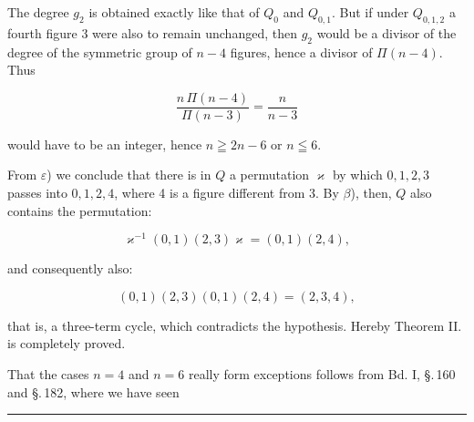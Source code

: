 The degree $g_2$ is obtained exactly like that of $Q_0$ and $Q_{0,1}$. But if
under $Q_{0,1,2}$ a fourth figure 3 were also to remain unchanged, then $g_2$
would be a divisor of the degree of the symmetric group of $n-4$ figures, hence
a divisor of $\Pi(n-4)$. Thus

\[ \frac{n\,\Pi(n-4)}{\Pi(n-3)} = \frac{n}{n-3} \]

would have to be an integer, hence $n \geqq 2n - 6$ or $n \leqq 6$.

From $\varepsilon$) we conclude that there is in $Q$ a permutation $\varkappa$
by which $0, 1, 2, 3$ passes into $0, 1, 2, 4$, where 4 is a figure different
from 3. By $\beta$), then, $Q$ also contains the permutation:

\[ \varkappa^{-1}(0,1)(2,3)\varkappa = (0,1)(2,4), \]

and consequently also:

\[ (0,1)(2,3)(0,1)(2,4) = (2,3,4), \]

that is, a three-term cycle, which contradicts the hypothesis. Hereby
Theorem II. is completely proved.

That the cases $n = 4$ and $n = 6$ really form exceptions follows from Bd. I,
\S.\,160 and \S.\,182, where we have seen 

\begin{center}
\rule{3cm}{0.4pt}
\end{center}
